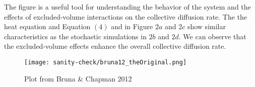 The figure is a useful tool for understanding the behavior of the system and the effects of excluded-volume interactions on the collective diffusion rate.
The the heat equation and Equation $(4)$ and in Figure $2a$ and $2c$ show similar characteristics as the stochastic simulations in $2b$ and $2d$. 
We can observe that the excluded-volume effects enhance the overall collective diffusion rate.




\begin{figure}[]
	\centering
    \texttt{[image: sanity-check/bruna12\_theOriginal.png]}
    \caption{Plot from Bruna & Chapman 2012}
\end{figure}






